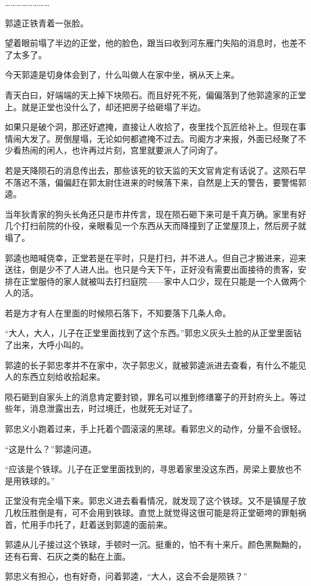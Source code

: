 ……………………

郭逵正铁青着一张脸。

望着眼前塌了半边的正堂，他的脸色，跟当曰收到河东雁门失陷的消息时，也差不了太多了。

今天郭逵是切身体会到了，什么叫做人在家中坐，祸从天上来。

青天白曰，好端端的天上掉下块陨石。而且好死不死，偏偏落到了他郭逵家的正堂上。就是正堂也没什么了，却还把房子给砸塌了半边。

如果只是破个洞，那还好遮掩，直接让人收拾了，夜里找个瓦匠给补上。但现在事情闹大发了。房倒屋塌，无论如何都遮掩不过去。司阍方才来报，外面已经聚了不少看热闹的闲人，也许再过片刻，宫里就要派人了问询了。

若是天降陨石的消息传出去，那些该死的钦天监的天文官肯定有话说了。这陨石早不落迟不落，偏偏赶在郭太尉住进来的时候落下来，自然是上天的警告，要警惕郭逵。

当年狄青家的狗头长角还只是市井传言，现在陨石砸下来可是千真万确。家里有好几个打扫前院的仆役，亲眼看见一个东西从天而降撞到了正堂屋顶上，然后房子就塌了。

郭逵也暗喊侥幸，正堂若是在平时，只是打扫，并不进人。但自己才搬进来，迎来送往，倒是少不了人进人出。也只是今天下午，正好没有需要出面接待的贵客，安排在正堂服侍的家人就被叫去打扫庭院——家中人口少，现在只能是一个人做两个人的活。

若是方才有人在里面的时候陨石落下，不知要落下几条人命。

“大人，大人，儿子在正堂里面找到了这个东西。”郭忠义灰头土脸的从正堂里面钻了出来，大呼小叫的。

郭逵的长子郭忠孝并不在家中，次子郭忠义，就被郭逵派进去查看，有什么不能见人的东西立刻给收拾起来。

陨石砸到自家头上的消息肯定要封锁，罪名可以推到修缮寨子的开封府头上。等过些年，消息泄露出去，时过境迁，也就死无对证了。

郭忠义小跑着过来，手上托着个圆滚滚的黑球。看郭忠义的动作，分量不会很轻。

“这是什么？”郭逵问道。

“应该是个铁球。儿子在正堂里面找到的，寻思着家里没这东西，房梁上要放也不是用铁球的。”

正堂没有完全塌下来。郭忠义进去看看情况，就发现了这个铁球。又不是镇屋子放几枚压胜倒是有，可不会用到铁球。直觉上就觉得这很可能是将正堂砸垮的罪魁祸首，忙用手巾托了，赶着送到郭逵的面前来。

郭逵从儿子接过这个铁球，手顿时一沉。挺重的，怕不有十来斤。颜色黑黝黝的，还有石膏、石灰之类的黏在上面。

郭忠义有担心，也有好奇，问着郭逵，“大人，这会不会是陨铁？”

